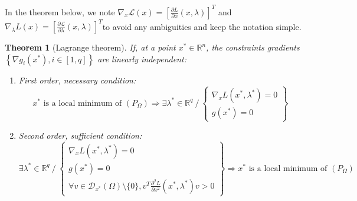 \documentclass{article}
\newtheorem*{theorem}{Theorem}
\begin{document}
\noindent In the theorem below, we note $\nabla_x \mathcal{L}(x) = \left[\frac{\partial L}{\partial x}(x,\lambda)\right]^T$ and $\nabla_\lambda L(x) = \left[\frac{\partial \mathcal{L}}{\partial \lambda}(x,\lambda)\right]^T$to avoid any ambiguities and keep the notation simple.
\begin{theorem}[Lagrange theorem]
If, at a point $x^*\in\mathbb{R}^n$, the constraints gradients $\left\{ \nabla g_i(x^*), i\in
[1,q] \right\}$ are linearly independent:
\begin{enumerate}
\item First order, necessary condition:
\begin{equation*}
x^*\textrm{ is a local minimum of }\left(P_\Omega\right) \Rightarrow \exists \lambda^*\in\mathbb{R}^q \ / \
\left\{\begin{array}{c}
\nabla_x L(x^*,\lambda^*)=0 \\
g(x^*)=0
\end{array}
\right\}
\end{equation*}
\item Second order, sufficient condition:
\begin{equation*}
\exists \lambda^*\in\mathbb{R}^q \ / \
\left\{\begin{array}{c}
\nabla_x L(x^*,\lambda^*)=0 \\
g(x^*)=0 \\
\forall v\in\mathcal{D}_{x^*}(\Omega)\setminus\{0\}, v^T \frac{\partial^2
L}{\partial x^2}(x^*,\lambda^*) v > 0 
\end{array}
\right\} \Rightarrow x^* \textrm{ is a local minimum of }
\left(P_\Omega\right)
\end{equation*}
\end{enumerate}
\end{theorem}
\end{document}
